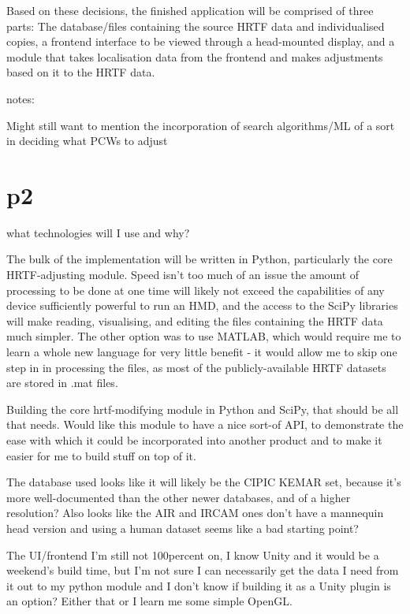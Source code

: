 \documentclass[10pt, oneside, a4paper, draft]{scrartcl}
\begin{document}
Based on these decisions, the finished application will be comprised of three parts: The database/files containing the source HRTF data and individualised copies, a frontend interface to be viewed through a head-mounted display, and a module that takes localisation data from the frontend and makes adjustments based on it to the HRTF data. 

notes: 

Might still want to mention the incorporation of search algorithms/ML of a sort in deciding what PCWs to adjust

\section*{p2}

what technologies will I use and why?

The bulk of the implementation will be written in Python, particularly the core HRTF-adjusting module. Speed isn't too much of an issue the amount of processing to be done at one time will likely not exceed the capabilities of any device sufficiently powerful to run an HMD, and the access to the SciPy libraries\cite{scipy website???} will make reading, visualising, and editing the files containing the HRTF data much simpler. The other option was to use MATLAB, which would require me to learn a whole new language for very little benefit - it would allow me to skip one step in in processing the files, as most of the publicly-available HRTF datasets are stored in .mat files.



Building the core hrtf-modifying module in Python and SciPy, that should be all that needs. Would like this module to have a nice sort-of API, to demonstrate the ease with which it could be incorporated into another product and to make it easier for me to build stuff on top of it.   

The database used looks like it will likely be the CIPIC KEMAR set, because it's more well-documented than the other newer databases, and of a higher resolution? Also looks like the AIR and IRCAM ones don't have a mannequin head version and using a human dataset seems like a bad starting point?  

The UI/frontend I'm still not 100percent on, I know Unity and it would be a weekend's build time, but I'm not sure I can necessarily get the data I need from it out to my python module and I don't know if building it as a Unity plugin is an option? Either that or I learn me some simple OpenGL. 
\end{document}
